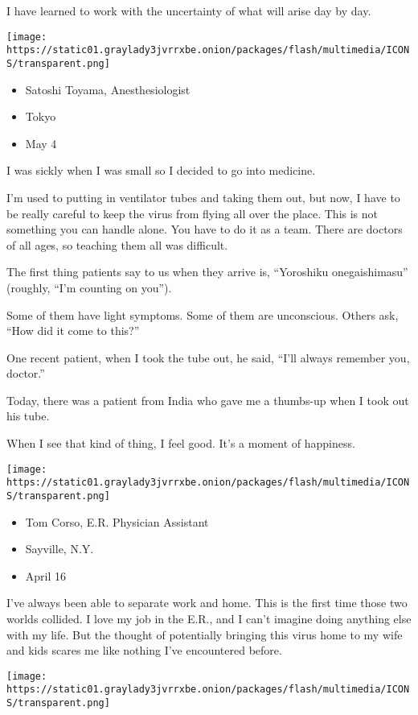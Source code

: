 I have learned to work with the uncertainty of what will arise day by
day.

\texttt{[image: https://static01.graylady3jvrrxbe.onion/packages/flash/multimedia/ICONS/transparent.png]}

\begin{itemize}
\tightlist
\item
  Satoshi Toyama, Anesthesiologist
\item
  Tokyo
\item
  May 4
\end{itemize}

I was sickly when I was small so I decided to go into medicine.

I'm used to putting in ventilator tubes and taking them out, but now, I
have to be really careful to keep the virus from flying all over the
place. This is not something you can handle alone. You have to do it as
a team. There are doctors of all ages, so teaching them all was
difficult.

The first thing patients say to us when they arrive is, ``Yoroshiku
onegaishimasu'' (roughly, ``I'm counting on you'').

Some of them have light symptoms. Some of them are unconscious. Others
ask, ``How did it come to this?''

One recent patient, when I took the tube out, he said, ``I'll always
remember you, doctor.''

Today, there was a patient from India who gave me a thumbs-up when I
took out his tube.

When I see that kind of thing, I feel good. It's a moment of happiness.

\texttt{[image: https://static01.graylady3jvrrxbe.onion/packages/flash/multimedia/ICONS/transparent.png]}

\begin{itemize}
\tightlist
\item
  Tom Corso, E.R. Physician Assistant
\item
  Sayville, N.Y.
\item
  April 16
\end{itemize}

I've always been able to separate work and home. This is the first time
those two worlds collided. I love my job in the E.R., and I can't
imagine doing anything else with my life. But the thought of potentially
bringing this virus home to my wife and kids scares me like nothing I've
encountered before.

\texttt{[image: https://static01.graylady3jvrrxbe.onion/packages/flash/multimedia/ICONS/transparent.png]}

